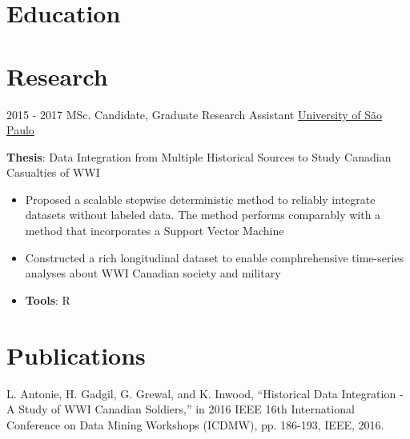 \documentclass[letterpaper]{twentysecondcv} %
\begin{document}
\makeprofile %

\section{Education}


\section{Research}
\begin{twenty}
	\twentyitem
    	{2015 - 2017}
		{}
        {MSc. Candidate, Graduate Research Assistant}
        {\href{http://www5.usp.br/}{University of São Paulo}}
        {}
        {
       	\textbf{Thesis}: Data Integration from Multiple Historical Sources to Study Canadian Casualties of WWI
        {\begin{itemize}
        \item Proposed a scalable stepwise deterministic method to reliably integrate datasets without labeled data. The method performs comparably with a method that incorporates a Support Vector Machine
        \item Constructed a rich longitudinal dataset to enable comphrehensive time-series analyses about WWI Canadian society and military
        \item \textbf{Tools}: R \vspace{2mm}
		\end{itemize}}
        }
\end{twenty}

\section{Publications}
L. Antonie, H. Gadgil, G. Grewal, and K. Inwood, “Historical Data Integration - A Study of WWI Canadian Soldiers,” in 2016 IEEE 16th International Conference on Data Mining Workshops (ICDMW), pp. 186-193, IEEE, 2016. \vspace{2mm}
\end{document}
